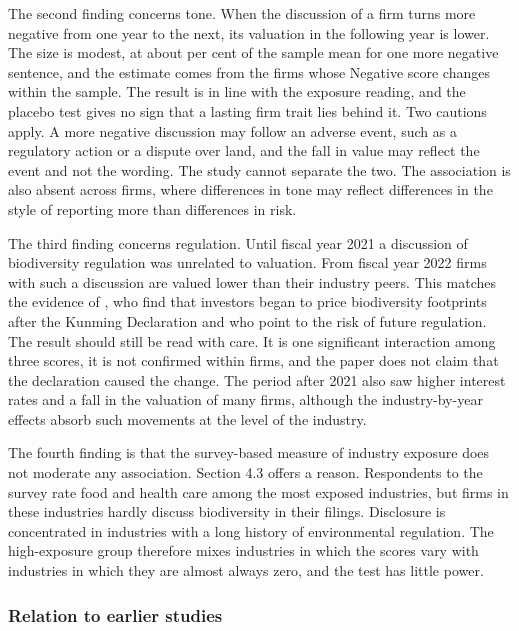 \documentclass[12pt,a4paper]{article}
\begin{document}
The second finding concerns tone. When the discussion of a firm turns more negative from one year to the next, its valuation in the following year is lower. The size is modest, at about \effNegMean{} per cent of the sample mean for one more negative sentence, and the estimate comes from the \nChangeNeg{} firms whose Negative score changes within the sample. The result is in line with the exposure reading, and the placebo test gives no sign that a lasting firm trait lies behind it. Two cautions apply. A more negative discussion may follow an adverse event, such as a regulatory action or a dispute over land, and the fall in value may reflect the event and not the wording. The study cannot separate the two. The association is also absent across firms, where differences in tone may reflect differences in the style of reporting more than differences in risk.

The third finding concerns regulation. Until fiscal year 2021 a discussion of biodiversity regulation was unrelated to valuation. From fiscal year 2022 firms with such a discussion are valued lower than their industry peers. This matches the evidence of \citet{garel2024}, who find that investors began to price biodiversity footprints after the Kunming Declaration and who point to the risk of future regulation. The result should still be read with care. It is one significant interaction among three scores, it is not confirmed within firms, and the paper does not claim that the declaration caused the change. The period after 2021 also saw higher interest rates and a fall in the valuation of many firms, although the industry-by-year effects absorb such movements at the level of the industry.

The fourth finding is that the survey-based measure of industry exposure does not moderate any association. Section 4.3 offers a reason. Respondents to the survey rate food and health care among the most exposed industries, but firms in these industries hardly discuss biodiversity in their filings. Disclosure is concentrated in industries with a long history of environmental regulation. The high-exposure group therefore mixes industries in which the scores vary with industries in which they are almost always zero, and the test has little power.

\subsubsection{Relation to earlier studies}
\end{document}
